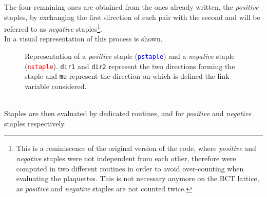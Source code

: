 The four remaining ones are obtained from the ones already written, the \emph{positive} staples, by exchanging the first direction of each pair with the second and will be referred to as \emph{negative} staples\footnote{This is a reminiscence of the original version of the code, where \emph{positive} and \emph{negative} staples were not independent from each other, therefore were computed in two different routines in order to avoid over-counting when evaluating the plaquettes. This is not necessary anymore on the BCT lattice, as \emph{positive} and \emph{negative} staples are not counted twice.}.\\
In  a visual representation of this process is shown.
\begin{figure}[!htbp]
    \centering
    \caption{Representation of a \emph{positive} staple (\textcolor{blue}{\texttt{pstaple}}) and a \emph{negative} staple (\textcolor{red}{\texttt{nstaple}}). \texttt{dir1} and \texttt{dir2} represent the two directions forming the staple and \texttt{mu} represent the direction on which is defined the link variable considered.}
    \label{4F:Staples}
\end{figure}\\
Staples are then evaluated by dedicated routines,  and  for \emph{positive} and \emph{negative} staples respectively.
